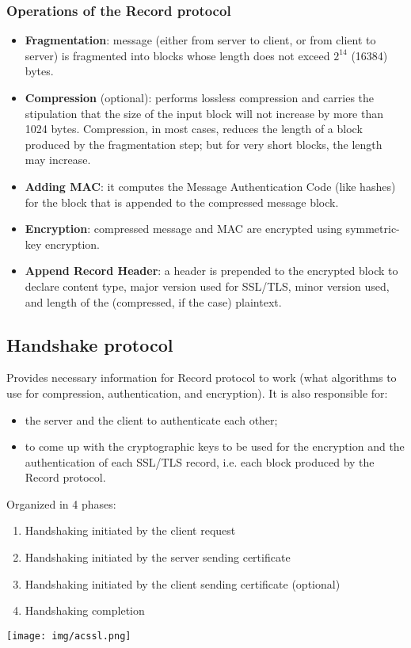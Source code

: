 \documentclass[a4paper, 10pt, titlepage]{article}
\begin{document}
\subsubsection{Operations of the Record protocol}
\begin{itemize}
\item \textbf{Fragmentation}: message (either from server to client, or from client to server) is fragmented into blocks whose length does not exceed $2^{14}$ (16384) bytes.
\item \textbf{Compression} (optional): performs lossless compression and carries the stipulation that the size of the input block will not increase by more than 1024 bytes. Compression, in most cases, reduces the length of a block produced by the fragmentation step; but for very short blocks, the length may increase.
\item \textbf{Adding MAC}: it computes the Message Authentication Code (like hashes) for the block that is appended to the compressed message block.
\item \textbf{Encryption}: compressed message and MAC are encrypted using symmetric-key encryption.
\item \textbf{Append Record Header}: a header is prepended to the encrypted block to declare content type, major version used for SSL/TLS, minor version used, and length of the (compressed, if the case) plaintext.
\end{itemize}

\subsection{Handshake protocol}
Provides necessary information for Record protocol to work (what algorithms to use for compression, authentication, and encryption). It is also responsible for:
\begin{itemize}
\item the server and the client to authenticate each other;
\item to come up with the cryptographic keys to be used for the encryption and the authentication of each SSL/TLS record, i.e. each block produced by the Record protocol.
\end{itemize}
Organized in 4 phases:
\begin{enumerate}
\item Handshaking initiated by the client request
\item Handshaking initiated by the server sending certificate
\item Handshaking initiated by the client sending certificate (optional)
\item Handshaking completion
\end{enumerate}
\begin{center}
\texttt{[image: img/acssl.png]}
\end{center}
\end{document}
